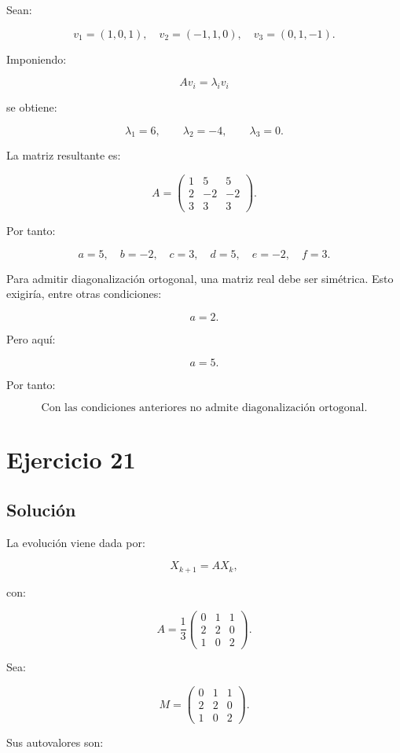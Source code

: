 \documentclass[11pt,a4paper]{article}
\begin{document}
Sean:

\[
v_1=(1,0,1),
\quad
v_2=(-1,1,0),
\quad
v_3=(0,1,-1).
\]

Imponiendo:

\[
Av_i=\lambda_i v_i
\]

se obtiene:

\[
\lambda_1=6,
\qquad
\lambda_2=-4,
\qquad
\lambda_3=0.
\]

La matriz resultante es:

\[
\boxed{
A=
\begin{pmatrix}
1&5&5\\
2&-2&-2\\
3&3&3
\end{pmatrix}.
}
\]

Por tanto:

\[
\boxed{
a=5,\quad b=-2,\quad c=3,\quad d=5,\quad e=-2,\quad f=3.
}
\]

Para admitir diagonalización ortogonal, una matriz real debe ser simétrica. Esto exigiría, entre otras condiciones:

\[
a=2.
\]

Pero aquí:

\[
a=5.
\]

Por tanto:

\[
\boxed{
\text{Con las condiciones anteriores no admite diagonalización ortogonal.}
}
\]

\section{Ejercicio 21}
\subsection{Solución}

La evolución viene dada por:

\[
X_{k+1}
=
AX_k,
\]

con:

\[
A=
\frac13
\begin{pmatrix}
0&1&1\\
2&2&0\\
1&0&2
\end{pmatrix}.
\]

Sea:

\[
M=
\begin{pmatrix}
0&1&1\\
2&2&0\\
1&0&2
\end{pmatrix}.
\]

Sus autovalores son:
\end{document}
